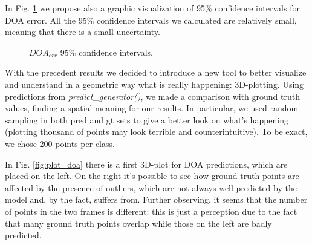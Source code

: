 \documentclass[11pt]{article}
\begin{document}
In Fig. \ref{fig:conf_int} we propose also a graphic visualization of 95\% confidence intervals for DOA error. All the 95\% confidence intervals we calculated are relatively small, meaning that there is a small uncertainty.


\begin{figure}[!tbp]
  \centering
  \hfill
  \caption{$DOA_{err}$ 95\% confidence intervals.}
  \label{fig:conf_int}
\end{figure}




\newpage
\noindent
With the precedent results we decided to introduce a new tool to better visualize and understand in a geometric way what is really happening: 3D-plotting. Using predictions from \textit{predict\_generator()}, we made a comparison with ground truth values, finding a spatial meaning for our results. In particular, we used random sampling in both pred and gt sets to give a better look on what's happening (plotting thousand of points may look terrible and counterintuitive). To be exact, we chose 200 points per class.

\noindent
In Fig. \ref{fig:plot_doa} there is a first 3D-plot for DOA predictions, which are placed on the left. On the right it's possible to see how ground truth points are affected by the presence of outliers, which are not always well predicted by the model and, by the fact, suffers from. Further observing, it seems that the number of points in the two frames is different: this is just a perception due to the fact that many ground truth points overlap while those on the left are badly predicted.
\end{document}
